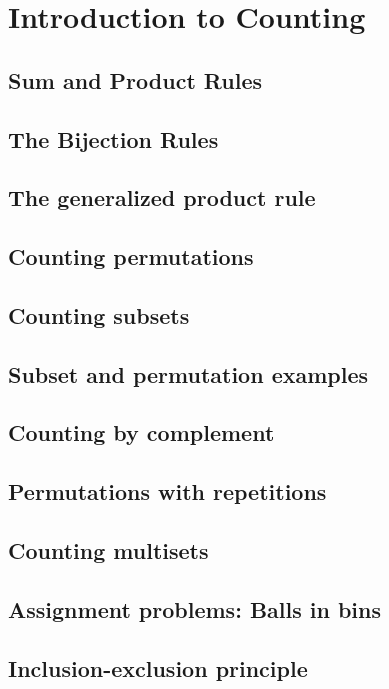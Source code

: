 \section{Introduction to Counting}
\subsection{Sum and Product Rules}
\subsection{The Bijection Rules}
\subsection{The generalized product rule}
\subsection{Counting permutations}
\subsection{Counting subsets}
\subsection{Subset and permutation examples}
\subsection{Counting by complement}
\subsection{Permutations with repetitions}
\subsection{Counting multisets}
\subsection{Assignment problems: Balls in bins}
\subsection{Inclusion-exclusion principle}